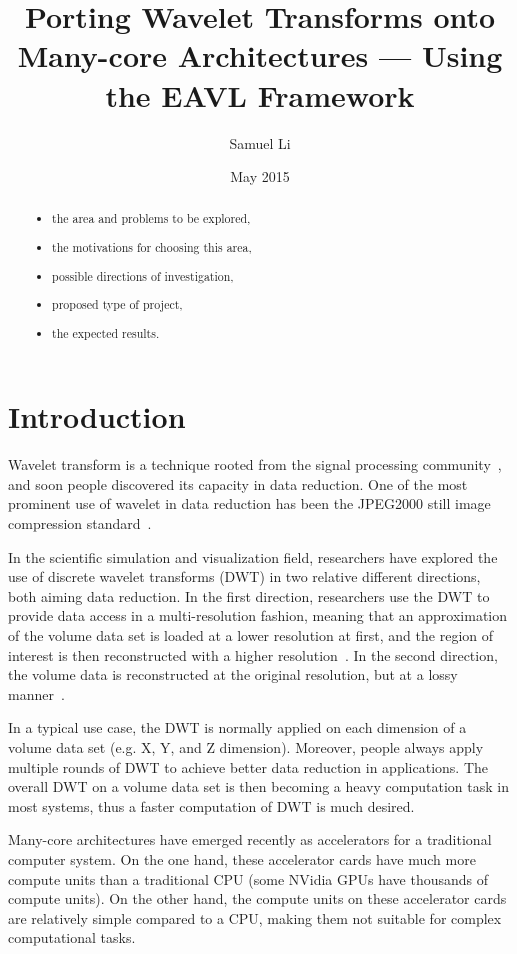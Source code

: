 \documentclass{article}
\title{Porting Wavelet Transforms onto Many-core Architectures ---
        Using the EAVL Framework}
\author{Samuel Li}
\date{May 2015}
\begin{document}
\maketitle

\begin{abstract}
\begin{itemize}
\item the area and problems to be explored, 
\item the motivations for choosing this area, 
\item possible directions of investigation, 
\item proposed type of project, 
\item the expected results.
\end{itemize}
\end{abstract}

\section{Introduction}
Wavelet transform is a technique rooted from the signal processing 
community~\cite{daubechies1990wavelet, mallat1999wavelet},
and soon people discovered its capacity in data reduction.
%
One of the most prominent use of wavelet in data reduction has been
the JPEG2000 still image compression
standard~\cite{adams2001jpeg,usevitch2001tutorial}. 

In the scientific simulation and visualization field, researchers have
explored the use of discrete wavelet transforms (DWT) in two 
relative different directions, both aiming data reduction.
%
In the first direction, researchers use the DWT to provide data access
in a multi-resolution fashion, meaning that an approximation of the volume data
set is loaded at a lower resolution at first, and the region of interest
is then reconstructed with a higher resolution~\cite{mallat1989theory,
kanai1998digital, baldwin2003multi}.
%
In the second direction, the volume data is reconstructed at the 
original resolution, but at a lossy manner~\cite{bethel2012high,
norton2012vapor}.

In a typical use case, the DWT is normally applied on each dimension of a
volume data set (e.g. X, Y, and Z dimension). 
%
Moreover, people always apply multiple rounds of DWT to achieve better
data reduction in applications.
%
The overall DWT on a volume data set is then becoming a heavy computation
task in most systems, thus a faster computation of DWT is much desired. 

Many-core architectures have emerged recently as accelerators for a 
traditional computer system.
%
On the one hand, these accelerator cards have much more compute units 
than a traditional CPU (some NVidia GPUs have thousands of compute units).
%
On the other hand, the compute units on these accelerator cards are 
relatively simple compared to a CPU, making them not suitable for complex 
computational tasks.
\end{document}
